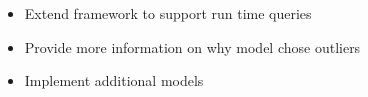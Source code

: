 \begin{block}{}
\begin{itemize}
\item Extend framework to support run time queries
\item Provide more information on why model chose outliers
\item Implement additional models 
\end{itemize}

\end{block}
